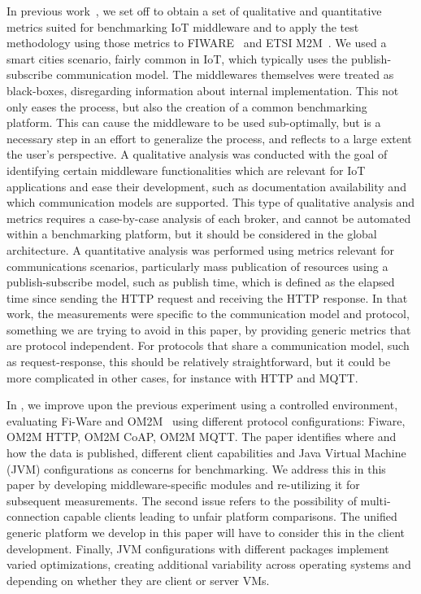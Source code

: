 \documentclass[conference]{IEEEtran}
\begin{document}
In previous work~\cite{cardoso_benchmarking_2017}, we set off to obtain a set of qualitative and quantitative metrics suited for benchmarking IoT middleware and to apply the test methodology using those metrics to FIWARE~\cite{FIWARE27:online} and ETSI M2M~\cite{ETSIWelc14:online}. %
We used a smart cities scenario, fairly common in IoT, which typically uses the publish-subscribe communication model. The middlewares themselves were treated as black-boxes, disregarding information about internal implementation. This not only eases the process, but also the creation of a common benchmarking platform. This can cause the middleware to be used sub-optimally, but is a necessary step in an effort to generalize the process, and reflects to a large extent the user's perspective. A qualitative analysis was conducted with the goal of identifying certain middleware functionalities which are relevant for IoT applications and ease their development, such as documentation availability and which communication models are supported. This type of qualitative analysis and metrics requires a case-by-case analysis of each broker, and cannot be automated within a benchmarking platform, but it should be considered in the global architecture. A quantitative analysis was performed using metrics relevant for communications scenarios, particularly mass publication of resources using a publish-subscribe model, such as publish time, which is defined as the elapsed time since sending the HTTP request and receiving the HTTP response. In that work, the measurements were specific to the communication model and protocol, something we are trying to avoid in this paper, by providing generic metrics that are protocol independent. For protocols that share a communication model, such as request-response, this should be relatively straightforward, but it could be more complicated in other cases, for instance with HTTP and MQTT\@.

In \cite{pereira_benchmarking_2018}, we improve upon the previous experiment using a controlled environment, %
evaluating Fi-Ware and OM2M~\cite{oneM2MHo30:online} using different protocol configurations: Fiware, OM2M HTTP, OM2M CoAP, OM2M MQTT. The paper identifies where and how the data is published, different client capabilities and Java Virtual Machine (JVM) configurations as concerns for benchmarking. %
We address this in this paper by developing middleware-specific modules and re-utilizing it for subsequent measurements. The second issue refers to the possibility of multi-connection capable clients leading to unfair platform comparisons. The unified generic platform we develop in this paper will have to consider this in the client development. Finally, JVM configurations with different packages implement varied optimizations, creating additional variability across operating systems and depending on whether they are client or server VMs. %
\end{document}
